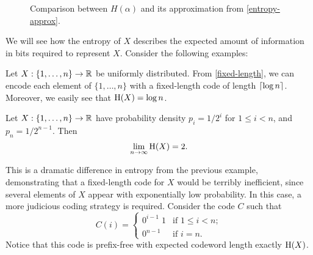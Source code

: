 \begin{figure}
  \centering
  \caption{Comparison between $H(\alpha)$ and its approximation from
    \eqref{entropy-approx}.}
\end{figure}

We will see how the entropy of $X$ describes the expected amount of
information in bits required to represent $X$. Consider the following
examples:
\begin{exm}
  Let $X : \{1, \ldots, n\} \to \mathbb{R}$ be uniformly distributed. From
  \eqref{fixed-length}, we can encode each element of
  $\{1, \ldots, n\}$ with a fixed-length code of length
  ${\lceil \log n \rceil}$. Moreover, we easily see that $\operatorname{\mathrm{H}}(X) = \log n$.
\end{exm}

\begin{exm}
  Let $X : \{1, \ldots, n\} \to \mathbb{R}$ have probability density
  $p_i = 1/2^i$ for $1 \leq i < n$, and $p_n = 1/2^{n - 1}$. Then
  \[\lim_{n \to \infty} \operatorname{\mathrm{H}}(X) = 2.\]

  This is a dramatic difference in entropy from the previous example,
  demonstrating that a fixed-length code for $X$ would be terribly
  inefficient, since several elements of $X$ appear with exponentially
  low probability. In this case, a more judicious coding strategy is
  required. Consider the code $C$ such that
  \[
  C(i) = \left\{
  \begin{array}{ll}
    0^{i - 1} \; 1 & \mbox{if $1 \leq i < n$};\\
    0^{n - 1} & \mbox{if $i = n$}.
  \end{array} \right.
  \]
  Notice that this code is prefix-free with expected codeword length
  exactly $\operatorname{\mathrm{H}}(X)$.
\end{exm}

